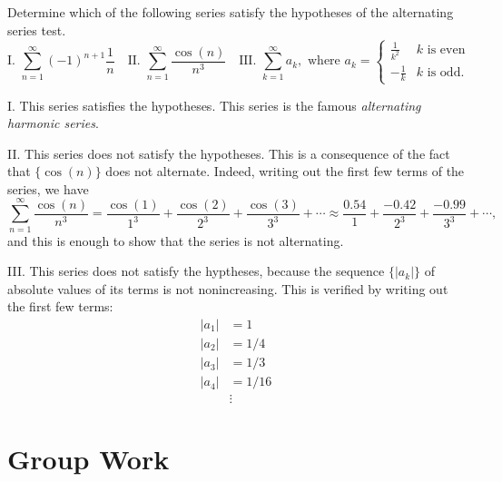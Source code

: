 \documentclass[noauthor]{ximera}
\begin{document}
\begin{problem}
Determine which of the following series satisfy the hypotheses of the alternating series test.
\[
\text{I. } \sum_{n=1}^\infty (-1)^{n+1} \frac{1}{n} \quad \text{II. } \sum_{n=1}^\infty \frac{\cos(n)}{n^3} \quad \text{III. } \sum_{k=1}^\infty a_k,\text{ where }a_k = \left\{\begin{array}{cc}
\frac{1}{k^2} & \mbox{$k$ is even} \\
-\frac{1}{k} & \mbox{$k$ is odd}. \end{array}\right.
\]
\begin{freeResponse}
I. This series satisfies the hypotheses. This series is the famous \emph{alternating harmonic series}.

II. This series does not satisfy the hypotheses. This is a consequence of the fact that $\{\cos(n)\}$ does not alternate. Indeed, writing out the first few terms of the series, we have
$$
\sum_{n=1}^\infty \frac{\cos(n)}{n^3} = \frac{\cos(1)}{1^3} + \frac{\cos(2)}{2^3} + \frac{\cos(3)}{3^3} + \cdots \approx \frac{0.54}{1} + \frac{-0.42}{2^3} + \frac{-0.99}{3^3} + \cdots,
$$
and this is enough to show that the series is not alternating.

III. This series does not satisfy the hyptheses, because the sequence $\{|a_k|\}$ of absolute values of its terms is not nonincreasing. This is verified by writing out the first few terms:
\begin{align*}
|a_1| &= 1\\
|a_2| &= 1/4 \\
|a_3| &= 1/3 \\
|a_4| &= 1/16 \\
&\vdots
\end{align*}
\end{freeResponse}
\end{problem}

\section{Group Work}
\end{document}
